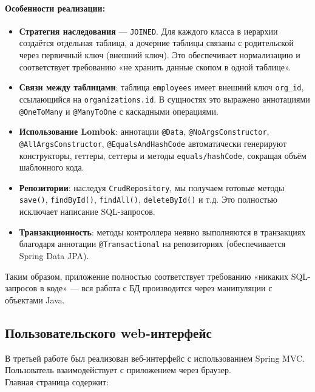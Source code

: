 \documentclass[oneside,a4paper,14pt]{extarticle}
\begin{document}
\paragraph{Особенности реализации:}
\begin{itemize}
	\item \textbf{Стратегия наследования} — \texttt{JOINED}. Для каждого класса в иерархии создаётся отдельная таблица, а дочерние таблицы связаны с родительской через первичный ключ (внешний ключ). Это обеспечивает нормализацию и соответствует требованию «не хранить данные скопом в одной таблице».
	\item \textbf{Связи между таблицами}: таблица \texttt{employees} имеет внешний ключ \texttt{org\_id}, ссылающийся на \texttt{organizations.id}. В сущностях это выражено аннотациями \texttt{@OneToMany} и \texttt{@ManyToOne} с каскадными операциями.
	\item \textbf{Использование Lombok}: аннотации \texttt{@Data}, \texttt{@NoArgsConstructor}, \texttt{@AllArgsConstructor}, \texttt{@EqualsAndHashCode} автоматически генерируют конструкторы, геттеры, сеттеры и методы \texttt{equals/hashCode}, сокращая объём шаблонного кода.
	\item \textbf{Репозитории}: наследуя \texttt{CrudRepository}, мы получаем готовые методы \texttt{save()}, \texttt{findById()}, \texttt{findAll()}, \texttt{deleteById()} и т.д. Это полностью исключает написание SQL-запросов.
	\item \textbf{Транзакционность}: методы контроллера неявно выполняются в транзакциях благодаря аннотации \texttt{@Transactional} на репозиториях (обеспечивается Spring Data JPA).
\end{itemize}

Таким образом, приложение полностью соответствует требованию «никаких SQL-запросов в коде» — вся работа с БД производится через манипуляции с объектами Java.

\newpage

\subsection*{Пользовательского web-интерфейс}

В третьей работе был реализован веб-интерфейс с использованием Spring MVC. Пользователь взаимодействует с приложением через браузер.\\

Главная страница содержит:
\end{document}
